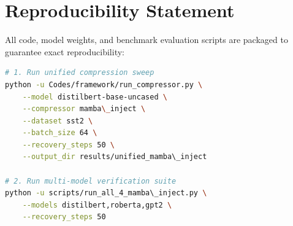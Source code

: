 \section{Reproducibility Statement}
All code, model weights, and benchmark evaluation scripts are packaged to guarantee exact reproducibility:
\begin{lstlisting}[language=bash]
# 1. Run unified compression sweep
python -u Codes/framework/run_compressor.py \
    --model distilbert-base-uncased \
    --compressor mamba\_inject \
    --dataset sst2 \
    --batch_size 64 \
    --recovery_steps 50 \
    --output_dir results/unified_mamba\_inject

# 2. Run multi-model verification suite
python -u scripts/run_all_4_mamba\_inject.py \
    --models distilbert,roberta,gpt2 \
    --recovery_steps 50
\end{lstlisting}
